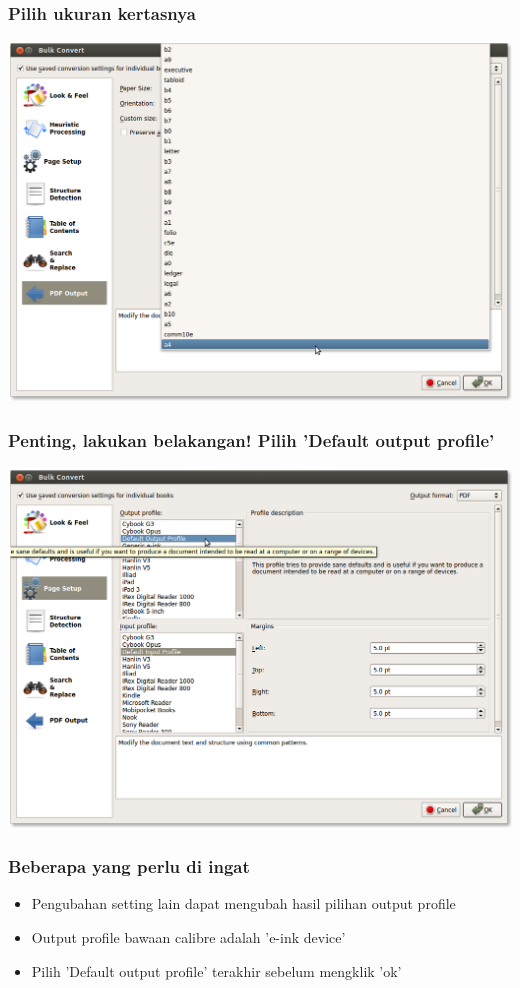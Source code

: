 \documentclass[11pt]{beamer}
\begin{document}
\begin{frame}[shrink]
\frametitle{Pilih ukuran kertasnya}
\includegraphics[width=\paperwidth]{graphic/choose_paper.png}
\end{frame}


\begin{frame}[shrink=20]
\frametitle{Penting, lakukan belakangan! Pilih 'Default output profile'}
\includegraphics[width=\paperwidth]{graphic/choose_default.png}
\end{frame}


\begin{frame}
\frametitle{Beberapa yang perlu di ingat}
\begin{itemize}
\item Pengubahan setting lain dapat mengubah hasil pilihan output profile 
\item Output profile bawaan calibre adalah 'e-ink device' 
\item Pilih 'Default output profile' terakhir sebelum mengklik 'ok'
\end{itemize}
\end{frame}
 
\end{document}
